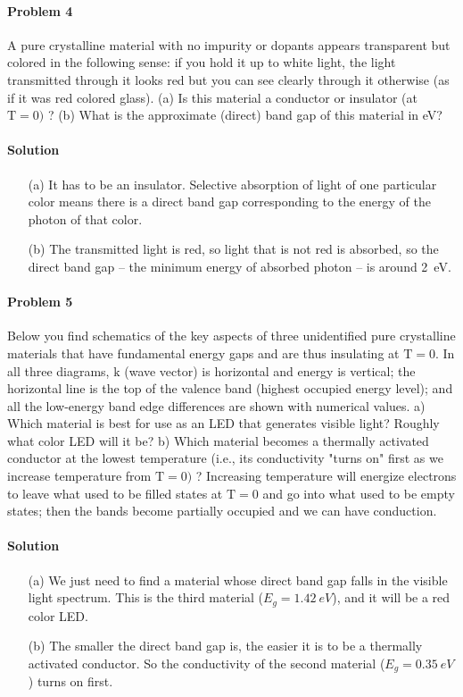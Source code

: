 \documentclass[hyperref, a4paper]{article}
\begin{document}
\paragraph{Problem 4} A pure crystalline material with no impurity or dopants appears transparent but colored in the following sense: if you hold it up to white light, the light transmitted through it looks red but you can see clearly through it otherwise (as if it was red colored glass).
(a) Is this material a conductor or insulator (at $\mathrm{T}=0)$ ?
(b) What is the approximate (direct) band gap of this material in eV?

\paragraph{Solution} \begin{itemize}
\item[(a)] It has to be an insulator.
Selective absorption of light of one particular color 
means there is a direct band gap corresponding to the energy 
of the photon of that color.
\item[(b)] The transmitted light is red, 
so light that is not red is absorbed,
so the direct band gap -- the minimum energy of absorbed photon -- 
is around \SI{2}{eV}.
\end{itemize}

\paragraph{Problem 5} Below you find schematics of the key aspects of three unidentified pure crystalline materials that have fundamental energy gaps and are thus insulating at $\mathrm{T}=0$. In all three diagrams, $\mathrm{k}$ (wave vector) is horizontal and energy is vertical; the horizontal line is the top of the valence band (highest occupied energy level); and all the low-energy band edge differences are shown with numerical values.
a) Which material is best for use as an LED that generates visible light? Roughly what color LED will it be?
b) Which material becomes a thermally activated conductor at the lowest temperature (i.e., its conductivity "turns on" first as we increase temperature from $\mathrm{T}=0)$ ? Increasing temperature will energize electrons to leave what used to be filled states at $\mathrm{T}=0$ and go into what used to be empty states; then the bands become partially occupied and we can have conduction.

\paragraph{Solution} \begin{itemize}
\item[(a)] We just need to find a material whose direct band gap falls in the visible light spectrum.
This is the third material ($E_g = \SI{1.42}{eV}$), 
and it will be a red color LED.
\item[(b)] The smaller the direct band gap is, 
the easier it is to be a thermally activated conductor.
So the conductivity of the second material ($E_{g} = \SI{0.35}{eV}$) 
turns on first.
\end{itemize}
\end{document}
